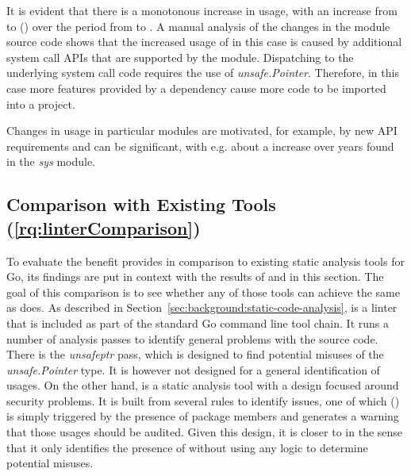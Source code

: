 

It is evident that there is a monotonous increase in \unsafe{} usage, with an increase from \sysModuleLeastUnsafe{} to
\sysModuleMostUnsafe{} (\sysModuleUnsafeIncrease) over the  period from  to
.
A manual analysis of the changes in the module source code shows that the increased usage of \unsafe{} in this case is
caused by additional system call \acrshort{API}s that are supported by the module.
Dispatching to the underlying system call code requires the use of \textit{unsafe.Pointer}.
Therefore, in this case more features provided by a dependency cause more \unsafe{} code to be imported into a project.


\begin{answerToRQ}[\ref{rq:changeTime}]
    Changes in \unsafe{} usage in particular modules are motivated, for example, by new \acrshort{API} requirements and
    can be significant, with e.g. about a \sysModuleUnsafeIncreaseRounded{} increase over  years found in
    the \textit{sys} module.
\end{answerToRQ}



\subsection{Comparison with Existing Tools (\ref{rq:linterComparison})}\label{subsec:go-geiger:evaluation:linters-comparison}

To evaluate the benefit \toolGeiger{} provides in comparison to existing static analysis tools for Go, its findings are
put in context with the results of \toolVet{} and \toolGosec{} in this section.
The goal of this comparison is to see whether any of those tools can achieve the same as \toolGeiger{} does.
As described in Section~\ref{sec:background:static-code-analysis}, \toolVet{} is a linter that is included as part of
the standard Go command line tool chain.
It runs a number of analysis passes to identify general problems with the source code.
There is the \textit{unsafeptr} pass, which is designed to find potential misuses of the \textit{unsafe.Pointer} type.
It is however not designed for a general identification of \unsafe{} usages.
On the other hand, \toolGosec{} is a static analysis tool with a design focused around security problems.
It is built from several rules to identify issues, one of which (\textit{}) is simply triggered by the
presence of \unsafe{} package members and generates a warning that those usages should be audited.
Given this design, it is closer to \toolGeiger{} in the sense that it only identifies the presence of \unsafe{} without
using any logic to determine potential misuses.

